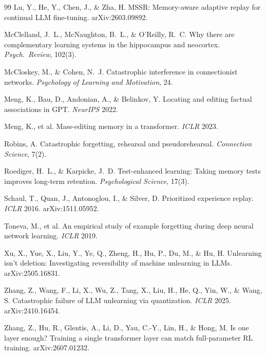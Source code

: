 \documentclass[11pt]{article}
\begin{document}
\begin{thebibliography}{99}
 Lu, Y., He, Y., Chen, J., \& Zha, H. MSSR: Memory-aware adaptive
replay for continual LLM fine-tuning. arXiv:2603.09892.

 McClelland, J.~L., McNaughton, B.~L., \& O'Reilly,
R.~C. Why there are complementary learning systems in the hippocampus and neocortex. \emph{Psych.\
Review}, 102(3).

 McCloskey, M., \& Cohen, N.~J. Catastrophic
interference in connectionist networks. \emph{Psychology of Learning and Motivation}, 24.

 Meng, K., Bau, D., Andonian, A., \& Belinkov, Y. Locating
and editing factual associations in GPT. \emph{NeurIPS} 2022.

 Meng, K., et al. Mass-editing memory in a transformer.
\emph{ICLR} 2023.

 Robins, A. Catastrophic forgetting, rehearsal and pseudorehearsal.
\emph{Connection Science}, 7(2).

 Roediger, H.~L., \& Karpicke, J.~D. Test-enhanced
learning: Taking memory tests improves long-term retention. \emph{Psychological Science}, 17(3).

 Schaul, T., Quan, J., Antonoglou, I., \& Silver, D.
Prioritized experience replay. \emph{ICLR} 2016. arXiv:1511.05952.

 Toneva, M., et al. An empirical study of example forgetting
during deep neural network learning. \emph{ICLR} 2019.

 Xu, X., Yue, X., Liu, Y., Ye, Q., Zheng, H., Hu, P.,
Du, M., \& Hu, H. Unlearning isn't deletion: Investigating reversibility of machine unlearning in
LLMs. arXiv:2505.16831.

 Zhang, Z., Wang, F., Li, X., Wu, Z., Tang, X.,
Liu, H., He, Q., Yin, W., \& Wang, S. Catastrophic failure of LLM unlearning via quantization.
\emph{ICLR} 2025. arXiv:2410.16454.

 Zhang, Z., Hu, R., Glentis, A., Li, D., Yau, C.-Y.,
Lin, H., \& Hong, M. Is one layer enough? Training a single transformer layer can match
full-parameter RL training. arXiv:2607.01232.

\end{thebibliography}
\end{document}
